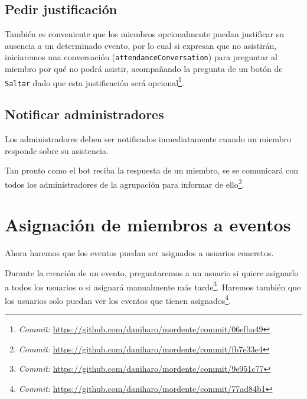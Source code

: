 \subsection{Pedir justificación}

También es conveniente que los miembros opcionalmente puedan justificar su ausencia a un determinado evento, por lo cual si expresan que no asistirán, iniciaremos una conversación (\texttt{attendanceConversation}) para preguntar al miembro por qué no podrá asistir, acompañando la pregunta de un botón de \texttt{Saltar} dado que esta justificación será opcional\footnote{\textit{Commit:} \url{https://github.com/daniharo/mordente/commit/06efba49}}.

\subsection{Notificar administradores}

Los administradores deben ser notificados inmediatamente cuando un miembro responde sobre su asistencia.

Tan pronto como el bot reciba la respuesta de un miembro, se se comunicará con todos los administradores de la agrupación para informar de ello\footnote{\textit{Commit:} \url{https://github.com/daniharo/mordente/commit/fb7e33e4}}.

\section{Asignación de miembros a eventos}

Ahora haremos que los eventos puedan ser asignados a usuarios concretos.

Durante la creación de un evento, preguntaremos a un usuario si quiere asignarlo a todos los usuarios o si asignará manualmente más tarde\footnote{\textit{Commit:} \url{https://github.com/daniharo/mordente/commit/9e951c77}}. Haremos también que los usuarios solo puedan ver los eventos que tienen asignados\footnote{\textit{Commit:} \url{https://github.com/daniharo/mordente/commit/77ad84b1}}.

